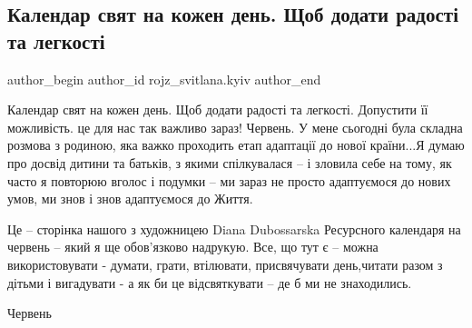  
 
 
 
 
 
\subsection{Календар свят на кожен день. Щоб додати радості та легкості}
\label{sec:09_06_2022.fb.rojz_svitlana.kyiv.1.kalendar_svjat}
 
\ifcmt
 author_begin
   author_id rojz_svitlana.kyiv
 author_end
\fi

Календар свят на кожен день. Щоб додати радості та легкості. Допустити її
можливість. це для нас так важливо зараз! Червень. У мене сьогодні була складна
розмова з родиною, яка важко проходить етап адаптації до нової країни...Я думаю
про досвід дитини та батьків, з якими  спілкувалася – і зловила себе на тому,
як часто я повторюю вголос і подумки – ми зараз не просто адаптуємося до нових
умов, ми знов і знов адаптуємося до Життя. 

Це – сторінка нашого з художницею Diana Dubossarska Ресурсного календаря на
червень  – який я ще обов'язково надрукую.  Все, що тут є – можна
використовувати - думати, грати, втілювати, присвячувати день,читати разом з
дітьми і вигадувати - а як би це відсвяткувати  – де б ми не знаходились. 

Червень

